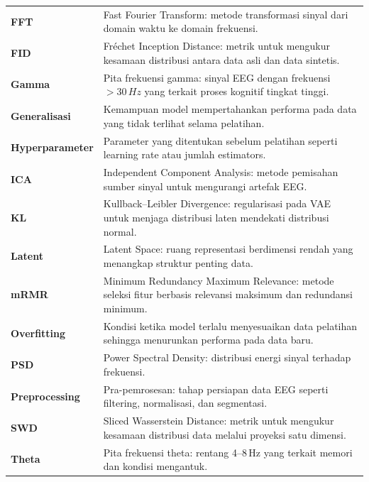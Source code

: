 \begin{longtable}{p{3cm} p{11cm}}
\textbf{FFT} & Fast Fourier Transform: metode transformasi sinyal dari domain waktu ke domain frekuensi. \\

\textbf{FID} & Fréchet Inception Distance: metrik untuk mengukur kesamaan distribusi antara data asli dan data sintetis. \\

\textbf{Gamma} & Pita frekuensi gamma: sinyal EEG dengan frekuensi $>30\,Hz$ yang terkait proses kognitif tingkat tinggi. \\

\textbf{Generalisasi} & Kemampuan model mempertahankan performa pada data yang tidak terlihat selama pelatihan. \\

\textbf{Hyperparameter} & Parameter yang ditentukan sebelum pelatihan seperti learning rate atau jumlah estimators. \\

\textbf{ICA} & Independent Component Analysis: metode pemisahan sumber sinyal untuk mengurangi artefak EEG. \\

\textbf{KL} & Kullback--Leibler Divergence: regularisasi pada VAE untuk menjaga distribusi laten mendekati distribusi normal. \\

\textbf{Latent} & Latent Space: ruang representasi berdimensi rendah yang menangkap struktur penting data. \\

\textbf{mRMR} & Minimum Redundancy Maximum Relevance: metode seleksi fitur berbasis relevansi maksimum dan redundansi minimum. \\

\textbf{Overfitting} & Kondisi ketika model terlalu menyesuaikan data pelatihan sehingga menurunkan performa pada data baru. \\

\textbf{PSD} & Power Spectral Density: distribusi energi sinyal terhadap frekuensi. \\

\textbf{Preprocessing} & Pra-pemrosesan: tahap persiapan data EEG seperti filtering, normalisasi, dan segmentasi. \\

\textbf{SWD} & Sliced Wasserstein Distance: metrik untuk mengukur kesamaan distribusi data melalui proyeksi satu dimensi. \\

\textbf{Theta} & Pita frekuensi theta: rentang 4--8\,Hz yang terkait memori dan kondisi mengantuk. \\


\end{longtable}
